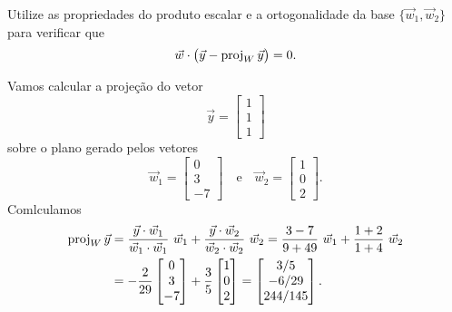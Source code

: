\documentclass[../livro.tex]{subfiles}  %
\begin{document}
\begin{exercise}
Utilize as propriedades do produto escalar e a ortogonalidade da base $\{\vec{w}_1, \vec{w}_2\}$ para verificar que
\begin{equation}
\vec{w} \cdot  \big( \vec{y} - \operatorname{proj}_W \vec{y} \big) = 0.
\end{equation}
\end{exercise}

\begin{example}
Vamos calcular a projeção do vetor
\begin{equation}
\vec{y} =
\begin{bmatrix}
 1\\1\\1
\end{bmatrix}
\end{equation} sobre o plano gerado pelos vetores
\begin{equation}
\vec{w}_1 =
\begin{bmatrix}
 0\\3\\-7
\end{bmatrix} \quad \text{e} \quad
\vec{w}_2 =
\begin{bmatrix}
 1\\0\\2
\end{bmatrix}.
\end{equation} Comlculamos
\begin{equation}
\begin{split}
\operatorname{proj}_W \vec{y} & = \frac{\vec{y} \cdot \vec{w}_1}{\vec{w}_1 \cdot \vec{w}_1} \ \vec{w}_1 + \frac{\vec{y} \cdot \vec{w}_2}{\vec{w}_2 \cdot \vec{w}_2} \ \vec{w}_2 = \frac{3-7}{9 + 49} \ \vec{w}_1 + \frac{1 + 2}{1+4} \ \vec{w}_2 \\
                & = -\frac{2}{29}
                \begin{bmatrix}
 0\\3\\-7
\end{bmatrix}
                + \frac{3}{5}
\begin{bmatrix}
 1\\0\\2
\end{bmatrix} =
\begin{bmatrix}
 3/5 \\ -6/29 \\ 244/145
\end{bmatrix}.
\end{split}
\end{equation}
\end{example}
\end{document}
